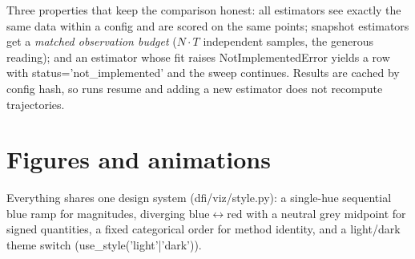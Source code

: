 \documentclass[11pt,a4paper]{article}
\newcommand{\code}[1]{{\ttfamily\small #1}}
\begin{document}
Three properties that keep the comparison honest: all estimators see exactly the same
data within a config and are scored on the same points; snapshot estimators get a
\emph{matched observation budget} ($N\!\cdot\!T$ independent samples, the generous
reading); and an estimator whose \code{fit} raises \code{NotImplementedError} yields a
row with \code{status='not\_implemented'} and the sweep continues. Results are cached by
config hash, so runs resume and adding a new estimator does not recompute trajectories.

\clearpage
\section{Figures and animations}

Everything shares one design system (\code{dfi/viz/style.py}): a single-hue sequential
blue ramp for magnitudes, diverging blue$\leftrightarrow$red with a neutral grey
midpoint for signed quantities, a fixed categorical order for method identity, and a
light/dark theme switch (\code{use\_style('light'|'dark')}).
\end{document}
